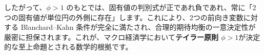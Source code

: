 \documentclass[
  japanese,
  lualatex,
  ja=standard,
  12pt,
  a4paper]{ltjsarticle}
\begin{document}
したがって、\(\phi>1\)
のもとでは、固有値の判別式が正であれ負であれ、常に「2つの固有値が単位円の外側に存在」します。これにより、2つの前向き変数に対する
Blanchard--Kahn
条件が完全に満たされ、合理的期待均衡の一意決定性が厳密に担保されます。これが、マクロ経済学において\textbf{テイラー原則
\(\phi>1\)}が決定的な至上命題とされる数学的根拠です。
\end{document}
